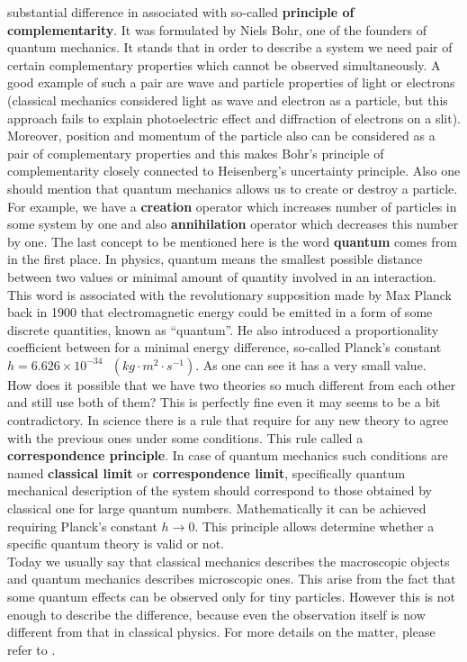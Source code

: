 \documentclass[twoside,english]{uiofysmaster}
\theoremstyle{definition}
\begin{document}
substantial difference in associated with so-called \textbf{principle of complementarity}. It was formulated by  Niels Bohr, one of the founders of quantum mechanics. It stands that in order to describe a system we need pair of certain complementary properties which cannot be observed simultaneously. A good example of such a pair are wave and particle properties of light or electrons (classical mechanics considered light as wave and electron as a particle, but this approach fails to explain photoelectric effect and diffraction of electrons on a slit). Moreover, position and momentum of the particle also can be considered as a pair of complementary properties and this makes Bohr's principle of complementarity closely connected to Heisenberg's uncertainty principle. Also one should mention that quantum mechanics allows us to create or destroy a particle. For example, we have a \textbf{creation} operator which increases number of particles in some system by one and also \textbf{annihilation} operator which decreases this number by one. The last concept to be mentioned here is the word \textbf{quantum} comes from in the first place. In physics, quantum means the smallest possible distance between two values or minimal amount of quantity involved in an interaction. This word is associated with the revolutionary supposition made by Max Planck back in 1900 that electromagnetic energy could be emitted in a form of some discrete quantities, known as “quantum”. He also introduced a  proportionality coefficient between for a minimal energy difference, so-called Planck's constant $h = 6.626 \times 10^{-34} \text{ } (kg \cdot m^2\cdot s^{-1})$. As one can see it has a very small value.  \\
How does it possible that we have two theories so much different from each other and still use both of them? This is perfectly fine even it may seems to be a bit contradictory. In science there is a rule that require for any new theory to agree with the previous ones under some conditions. This rule called a \textbf{correspondence principle}. In case of quantum mechanics such conditions are named \textbf{classical limit} or \textbf{correspondence limit}, specifically quantum mechanical description of the system should correspond to those obtained by classical one for large quantum numbers. Mathematically it can be achieved requiring Planck's constant $h \rightarrow 0$. This principle allows determine whether a specific quantum theory is valid or not.\\
Today we usually say that classical mechanics describes the macroscopic objects and quantum mechanics describes microscopic ones. This arise from the fact that some quantum effects can be observed only for tiny particles. However this is not enough to describe the difference, because even the observation itself is now different from that in classical physics. 
For more details on the matter, please refer to \cite{phillipsIntroductionQuantumMechanics2003}. \\
\end{document}
